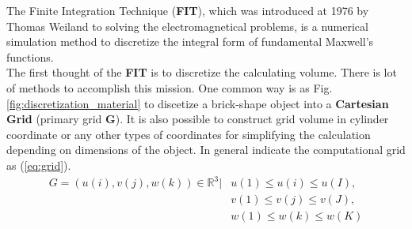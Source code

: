 The Finite Integration Technique (\textbf{FIT}), which was introduced at 1976 by Thomas Weiland\cite{FIT_discrete_method} to solving the electromagnetical problems, is a numerical simulation method to discretize the integral form of fundamental Maxwell's functions.\\

The first thought of the \textbf{FIT} is to discretize the calculating volume. There is lot of methods to accomplish this mission. One common way is as Fig. \ref{fig:discretization_material} to discetize a brick-shape object into a \textbf{Cartesian Grid} (primary grid \textbf{G}). It is also possible to construct grid volume in cylinder coordinate or any other types of  coordinates\cite{FIT_triangular_discretization,FDTD_nonorthogonal_grids} for simplifying the calculation depending on dimensions of the object. In general \cite{script_FeldSim} indicate the computational grid as (\ref{eq:grid}).\\
\begin{align}
G=
(u(i),v(j),w(k))\in \mathbb{R}^3|&u(1)\leq u(i)\leq u(I),\nonumber\\
													 &v(1)\leq v(j)\leq v(J),\nonumber\\ 
													 &w(1)\leq w(k)\leq w(K)
\label{eq:grid}
\end{align}

